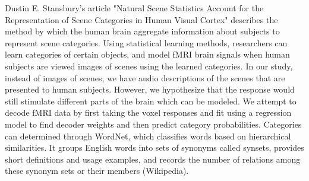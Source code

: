 \par \indent Dustin E. Stansbury's article "Natural Scene Statistics Account for the Representation of 
Scene Categories in Human Visual Cortex" describes the method by which the human brain 
aggregate information about subjects to represent scene categories. Using statistical learning 
methods, researchers can learn categories of certain objects, and model fMRI brain signals 
when human subjects are viewed images of scenes using the learned categories. In our study, 
instead of images of scenes, we have audio descriptions of the scenes that are presented to 
human subjects. However, we hypothesize that the response would still stimulate different parts of the brain which can be modeled. We attempt to decode fMRI data by first taking the voxel responses and fit using a regression model to find decoder weights and then predict category probabilities. Categories can determined through WordNet, which classifies words based on hierarchical similarities. It groups English words into sets of synonyms called synsets, provides short definitions and usage examples, and records the number of relations among these synonym sets or their members (Wikipedia).
